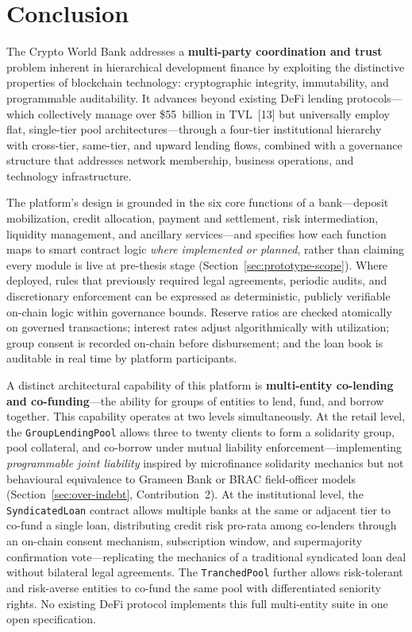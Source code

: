 \documentclass[12pt,a4paper]{report}
\begin{document}
\chapter{Conclusion}

The Crypto World Bank addresses a \textbf{multi-party coordination and trust} problem inherent in hierarchical development finance by exploiting the distinctive properties of blockchain technology: cryptographic integrity, immutability, and programmable auditability. It advances beyond existing DeFi lending protocols---which collectively manage over \$55~billion in TVL~[13] but universally employ flat, single-tier pool architectures---through a four-tier institutional hierarchy with cross-tier, same-tier, and upward lending flows, combined with a governance structure that addresses network membership, business operations, and technology infrastructure.

The platform's design is grounded in the six core functions of a bank---deposit mobilization, credit allocation, payment and settlement, risk intermediation, liquidity management, and ancillary services---and specifies how each function maps to smart contract logic \textit{where implemented or planned}, rather than claiming every module is live at pre-thesis stage (Section~\ref{sec:prototype-scope}). Where deployed, rules that previously required legal agreements, periodic audits, and discretionary enforcement can be expressed as deterministic, publicly verifiable on-chain logic within governance bounds. Reserve ratios are checked atomically on governed transactions; interest rates adjust algorithmically with utilization; group consent is recorded on-chain before disbursement; and the loan book is auditable in real time by platform participants.

A distinct architectural capability of this platform is \textbf{multi-entity co-lending and co-funding}---the ability for groups of entities to lend, fund, and borrow together. This capability operates at two levels simultaneously. At the retail level, the \texttt{GroupLendingPool} allows three to twenty clients to form a solidarity group, pool collateral, and co-borrow under mutual liability enforcement---implementing \textit{programmable joint liability} inspired by microfinance solidarity mechanics but not behavioural equivalence to Grameen Bank or BRAC field-officer models (Section~\ref{sec:over-indebt}, Contribution~2). At the institutional level, the \texttt{SyndicatedLoan} contract allows multiple banks at the same or adjacent tier to co-fund a single loan, distributing credit risk pro-rata among co-lenders through an on-chain consent mechanism, subscription window, and supermajority confirmation vote---replicating the mechanics of a traditional syndicated loan deal without bilateral legal agreements. The \texttt{TranchedPool} further allows risk-tolerant and risk-averse entities to co-fund the same pool with differentiated seniority rights. No existing DeFi protocol implements this full multi-entity suite in one open specification.
\end{document}
